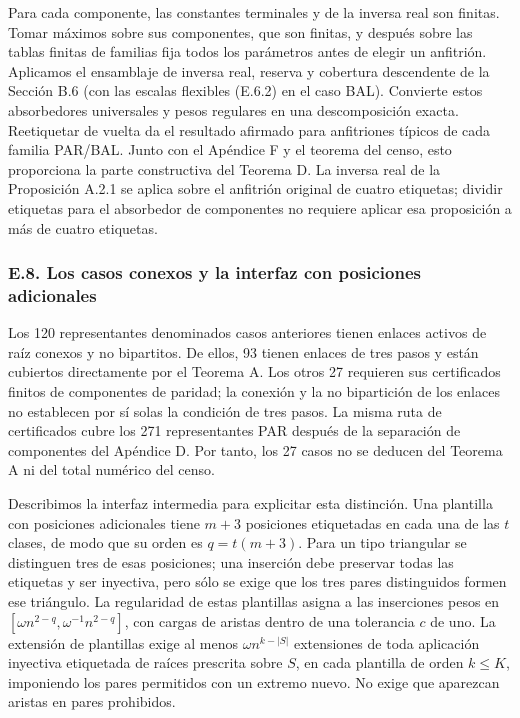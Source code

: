 \documentclass[spanish,11pt,a4paper]{article}
\begin{document}
Para cada componente, las constantes terminales y de la inversa real son finitas. Tomar máximos sobre sus componentes, que son finitas, y después sobre las tablas finitas de familias fija todos los parámetros antes de elegir un anfitrión. Aplicamos el ensamblaje de inversa real, reserva y cobertura descendente de la Sección B.6 (con las escalas flexibles (E.6.2) en el caso BAL). Convierte estos absorbedores universales y pesos regulares en una descomposición exacta. Reetiquetar de vuelta da el resultado afirmado para anfitriones típicos de cada familia PAR/BAL. Junto con el Apéndice F y el teorema del censo, esto proporciona la parte constructiva del Teorema D. La inversa real de la Proposición A.2.1 se aplica sobre el anfitrión original de cuatro etiquetas; dividir etiquetas para el absorbedor de componentes no requiere aplicar esa proposición a más de cuatro etiquetas.

\bigskip

\subsubsection{E.8. Los casos conexos y la interfaz con posiciones adicionales}\label{e.8.-los-casos-conexos-y-la-interfaz-con-posiciones-adicionales}

Los 120 representantes denominados casos anteriores tienen enlaces activos de raíz conexos y no bipartitos. De ellos, 93 tienen enlaces de tres pasos y están cubiertos directamente por el Teorema A. Los otros 27 requieren sus certificados finitos de componentes de paridad; la conexión y la no bipartición de los enlaces no establecen por sí solas la condición de tres pasos. La misma ruta de certificados cubre los 271 representantes PAR después de la separación de componentes del Apéndice D. Por tanto, los 27 casos no se deducen del Teorema A ni del total numérico del censo.

Describimos la interfaz intermedia para explicitar esta distinción. Una plantilla con posiciones adicionales tiene \(m+3\) posiciones etiquetadas en cada una de las \(t\) clases, de modo que su orden es \(q=t(m+3)\). Para un tipo triangular se distinguen tres de esas posiciones; una inserción debe preservar todas las etiquetas y ser inyectiva, pero sólo se exige que los tres pares distinguidos formen ese triángulo. La regularidad de estas plantillas asigna a las inserciones pesos en \([\omega n^{2-q},\omega^{-1}n^{2-q}]\), con cargas de aristas dentro de una tolerancia \(c\) de uno. La extensión de plantillas exige al menos \(\omega n^{k-|S|}\) extensiones de toda aplicación inyectiva etiquetada de raíces prescrita sobre \(S\), en cada plantilla de orden \(k\le K\), imponiendo los pares permitidos con un extremo nuevo. No exige que aparezcan aristas en pares prohibidos.
\end{document}
